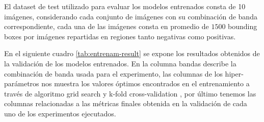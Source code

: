 El dataset de test utilizado para evaluar los modelos entrenados consta de 10 imágenes, considerando cada conjunto de imágenes con su combinación de banda correspondiente, cada una de las imágenes consta en promedio de $1500$ bounding boxes por imágenes repartidas en regiones tanto negativas como positivas.


En el siguiente cuadro \ref{tab:entrenam-result} se expone los resultados obtenidos de la validación de los modelos entrenados. En la columna bandas describe la combinación de banda usada para el experimento, las columnas  de los  hiper-parámetros nos muestra los valores óptimos encontrados en el entrenamiento a través de algoritmo grid search y k-fold cross-validation , por último tenemos las columnas relacionadas a las métricas finales obtenida en la validación de cada uno de los experimentos ejecutados.


